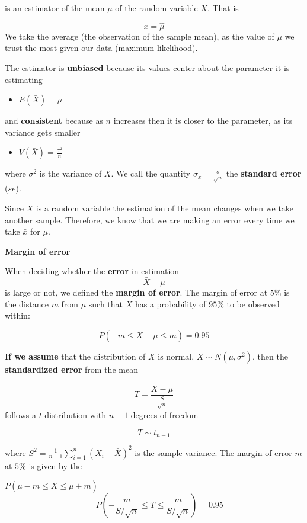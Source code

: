 \documentclass[
]{book}
\providecommand{\tightlist}{%
  \setlength{\itemsep}{0pt}\setlength{\parskip}{0pt}}
\begin{document}
is an estimator of the mean \(\mu\) of the random variable \(X\). That is

\[\bar{x}=\hat{\mu}\]
We take the average (the observation of the sample mean), as the value of \(\mu\) we trust the most given our data (maximum likelihood).

The estimator is \textbf{unbiased} because its values center about the parameter it is estimating

\begin{itemize}
\tightlist
\item
  \(E(\bar{X})=\mu\)
\end{itemize}

and \textbf{consistent} because as \(n\) increases then it is closer to the parameter, as its variance gets smaller

\begin{itemize}
\tightlist
\item
  \(V(\bar{X})=\frac{\sigma^2}{n}\)
\end{itemize}

where \(\sigma^2\) is the variance of \(X\). We call the quantity \(\sigma_{\bar{x}}=\frac{\sigma}{\sqrt{n}}\) the \textbf{standard error} (\(se\)).

Since \(\bar{X}\) is a random variable the estimation of the mean changes when we take another sample. Therefore, we know that we are making an error every time we take \(\bar{x}\) for \(\mu\).

\textbf{Margin of error}

When deciding whether the \textbf{error} in estimation \[\bar{X}-\mu\] is large or not, we defined the \textbf{margin of error}. The margin of error at \(5\%\) is the distance \(m\) from \(\mu\) such that \(\bar{X}\) has a probability of \(95\%\) to be observed within:

\[P(-m \leq \bar{X}-\mu \leq m)=0.95\]

\textbf{If we assume} that the distribution of \(X\) is normal, \(X \sim N(\mu, \sigma^2)\), then the \textbf{standardized error} from the mean

\[T=\frac{\bar{X}-\mu}{\frac{S}{\sqrt{n}}}\]
follows a \(t\)-distribution with \(n-1\) degrees of freedom

\[T \sim t_{n-1}\]

where \(S^2=\frac{1}{n-1} \sum_{i=1}^n (X_i-\bar{X})^2\) is the sample variance. The margin of error \(m\) at \(5\%\) is given by the

\(P(\mu-m \leq \bar{X} \leq\mu + m)\)
\[=P(-\frac{m}{S/\sqrt{n}} \leq T \leq\frac{m}{S/\sqrt{n}})=0.95\]
\end{document}
